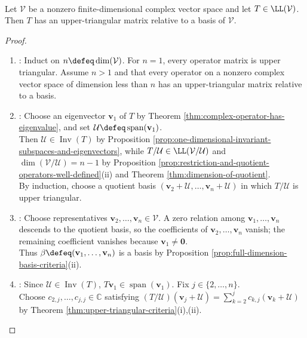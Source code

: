 \begin{theorem} \label{thm:complex-upper-triangularization} \\
Let $\mathcal{V}$ be a nonzero finite-dimensional complex vector space and let $T\in\LL(\mathcal{V})$.\\
Then $T$ has an upper-triangular matrix relative to a basis of $\mathcal{V}$.
\begin{proof}
\begin{enumerate}[label=(\roman*)]
\setlength{\itemsep}{0pt}
\item {}: Induct on $n\defeq\dim(\mathcal{V})$. For $n=1$, every operator matrix is upper triangular. Assume $n>1$ and that every operator on a nonzero complex vector space of dimension less than $n$ has an upper-triangular matrix relative to a basis.
\item {}: Choose an eigenvector $\mathbf{v}_1$ of $T$ by Theorem \ref{thm:complex-operator-has-eigenvalue}, and set $\mathcal{U}\defeq\operatorname{span}(\mathbf{v}_1)$.\\
Then $\mathcal{U}\in\operatorname{Inv}(T)$ by Proposition \ref{prop:one-dimensional-invariant-subspaces-and-eigenvectors}, while $T/\mathcal{U}\in\LL(\mathcal{V}/\mathcal{U})$ and $\dim(\mathcal{V}/\mathcal{U})=n-1$ by Proposition \ref{prop:restriction-and-quotient-operators-well-defined}(ii) and Theorem \ref{thm:dimension-of-quotient}.\\
By induction, choose a quotient basis $(\mathbf{v}_2+\mathcal{U},\ldots,\mathbf{v}_n+\mathcal{U})$ in which $T/\mathcal{U}$ is upper triangular.
\item {}: Choose representatives $\mathbf{v}_2,\ldots,\mathbf{v}_n\in\mathcal{V}$. A zero relation among $\mathbf{v}_1,\ldots,\mathbf{v}_n$ descends to the quotient basis, so the coefficients of $\mathbf{v}_2,\ldots,\mathbf{v}_n$ vanish; the remaining coefficient vanishes because $\mathbf{v}_1\neq\mathbf{0}$.\\
Thus $\beta\defeq(\mathbf{v}_1,\ldots,\mathbf{v}_n)$ is a basis by Proposition \ref{prop:full-dimension-basis-criteria}(ii).
\item {}: Since $\mathcal{U}\in\operatorname{Inv}(T)$, $T\mathbf{v}_1\in\operatorname{span}(\mathbf{v}_1)$. Fix $j\in\{2,\ldots,n\}$.\\
Choose $c_{2,j},\ldots,c_{j,j}\in\mathbb{C}$ satisfying $(T/\mathcal{U})(\mathbf{v}_j+\mathcal{U})=\sum\limits_{k=2}^{j}c_{k,j}(\mathbf{v}_k+\mathcal{U})$ by Theorem \ref{thm:upper-triangular-criteria}(i),(ii).\\

\end{enumerate}
\end{proof}
\end{theorem}
